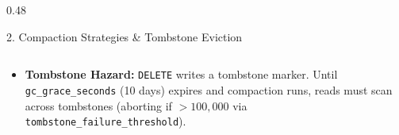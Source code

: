 \documentclass[aspectratio=169]{beamer}
\begin{document}
\begin{frame}[fragile]
\begin{columns}[T]
\begin{column}{0.48\textwidth}
\begin{block}{\tiny 2. Compaction Strategies \& Tombstone Eviction}
\begin{tabular}{p{1.2cm}p{2.3cm}p{2.3cm}}
\bottomrule
\end{tabular}
\vspace{0.05cm}
\raggedright
\tiny
\begin{itemize}
    \item \textbf{Tombstone Hazard:} \texttt{DELETE} writes a tombstone marker. Until \texttt{gc\_grace\_seconds} (10 days) expires and compaction runs, reads must scan across tombstones (aborting if $>100,000$ via \texttt{tombstone\_failure\_threshold}).
\end{itemize}
\end{block}
\end{column}
\end{columns}
\end{frame}

\end{document}
